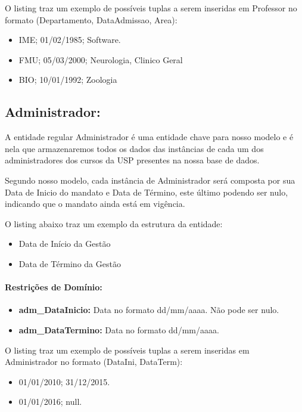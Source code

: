\documentclass{report}
\begin{document}
O listing traz um exemplo de possíveis tuplas a serem inseridas em Professor no formato (Departamento, DataAdmissao, Area):

\begin{itemize}
	\item IME; 01/02/1985; Software. 
	\item FMU; 05/03/2000; Neurologia, Clinico Geral
	\item BIO; 10/01/1992; Zoologia
\end{itemize}

\subsection{Administrador:}
A entidade regular Administrador é uma entidade chave para nosso modelo e é nela que armazenaremos todos os dados das instâncias de cada um dos administradores dos cursos da USP presentes na nossa base de dados.
	
	Segundo nosso modelo, cada instância de Administrador será composta por sua Data de Inicio do mandato e Data de Término, este último podendo ser nulo, indicando que o mandato ainda está em vigência.
		
	O listing abaixo traz um exemplo da estrutura da entidade:
\begin{itemize}
  \item Data de Início da Gestão
  \item Data de Término da Gestão
\end{itemize}
\paragraph{Restrições de Domínio:}
\begin{itemize}
  \item \textbf{adm\_DataInicio:} Data no formato dd/mm/aaaa. Não pode ser nulo.
  \item \textbf{adm\_DataTermino:} Data no formato dd/mm/aaaa.
\end{itemize}
O listing traz um exemplo de possíveis tuplas a serem inseridas em Administrador no formato (DataIni, DataTerm):

\begin{itemize}
	\item 01/01/2010; 31/12/2015. 
	\item 01/01/2016; null.
\end{itemize}
\end{document}
